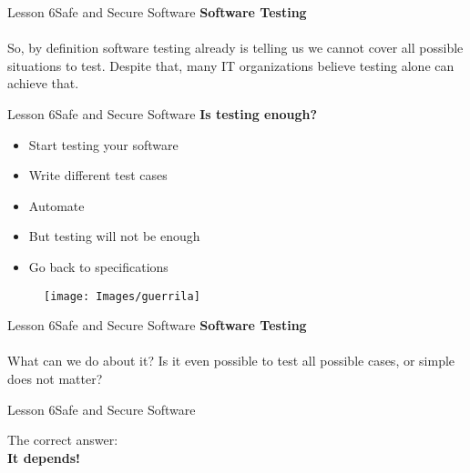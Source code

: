 \documentclass[aspectratio=1610]{beamer}
\begin{document}
\begin{frame}{Lesson 6}{Safe and Secure Software}
\LARGE
\textbf{Software Testing}\\~\\
So, by definition software testing already is telling us we cannot cover all possible 
situations to test. Despite that, many IT organizations believe testing alone can
achieve that.
\end{frame}


\begin{frame}{Lesson 6}{Safe and Secure Software}
{\LARGE\textbf{{Is testing enough?}}}\\
\Large
\begin{minipage}{0.50\textwidth}
    \begin{itemize}
      \item Start testing your software
      \item Write different test cases
      \item Automate
      \item But testing will not be enough
      \item Go back to specifications
    \end{itemize}
  \end{minipage}
\begin{minipage}{0.4\textwidth}
      \begin{figure}
        \texttt{[image: Images/guerrila]}
      \end{figure}
  \end{minipage}  
\end{frame}



\begin{frame}{Lesson 6}{Safe and Secure Software}
\LARGE
\textbf{Software Testing}\\~\\
What can we do about it? Is it even possible to test all possible cases, or simple does 
not matter?
\end{frame}



\begin{frame}{Lesson 6}{Safe and Secure Software}
\Huge
\begin{center}
The correct answer:\\
\textbf{It depends!}
\end{center}
\end{frame}
\end{document}
